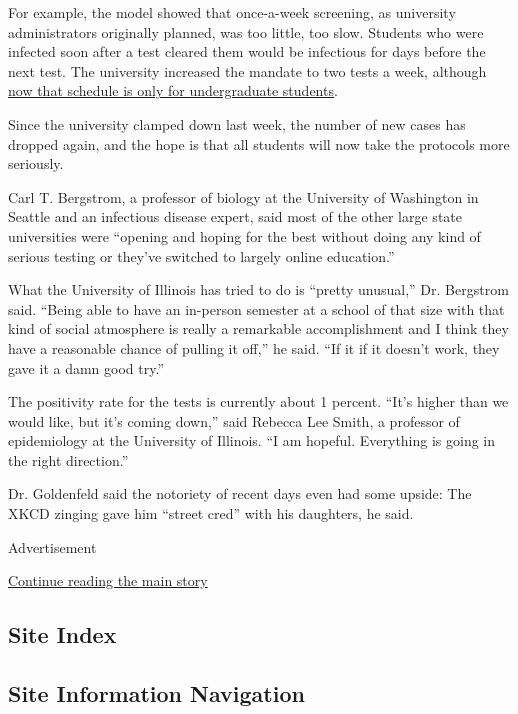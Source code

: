 For example, the model showed that once-a-week screening, as university
administrators originally planned, was too little, too slow. Students
who were infected soon after a test cleared them would be infectious for
days before the next test. The university increased the mandate to two
tests a week, although
\href{https://dailyillini.com/news/2020/09/10/university-changes-covid-19-testing-schedule/}{now
that schedule is only for undergraduate students}.

Since the university clamped down last week, the number of new cases has
dropped again, and the hope is that all students will now take the
protocols more seriously.

Carl T. Bergstrom, a professor of biology at the University of
Washington in Seattle and an infectious disease expert, said most of the
other large state universities were ``opening and hoping for the best
without doing any kind of serious testing or they've switched to largely
online education.''

What the University of Illinois has tried to do is ``pretty unusual,''
Dr. Bergstrom said. ``Being able to have an in-person semester at a
school of that size with that kind of social atmosphere is really a
remarkable accomplishment and I think they have a reasonable chance of
pulling it off,'' he said. ``If it if it doesn't work, they gave it a
damn good try.''

The positivity rate for the tests is currently about 1 percent. ``It's
higher than we would like, but it's coming down,'' said Rebecca Lee
Smith, a professor of epidemiology at the University of Illinois. ``I am
hopeful. Everything is going in the right direction.''

Dr. Goldenfeld said the notoriety of recent days even had some upside:
The XKCD zinging gave him ``street cred'' with his daughters, he said.

Advertisement

\protect\hyperlink{after-bottom}{Continue reading the main story}

\hypertarget{site-index}{%
\subsection{Site Index}\label{site-index}}

\hypertarget{site-information-navigation}{%
\subsection{Site Information
Navigation}\label{site-information-navigation}}

